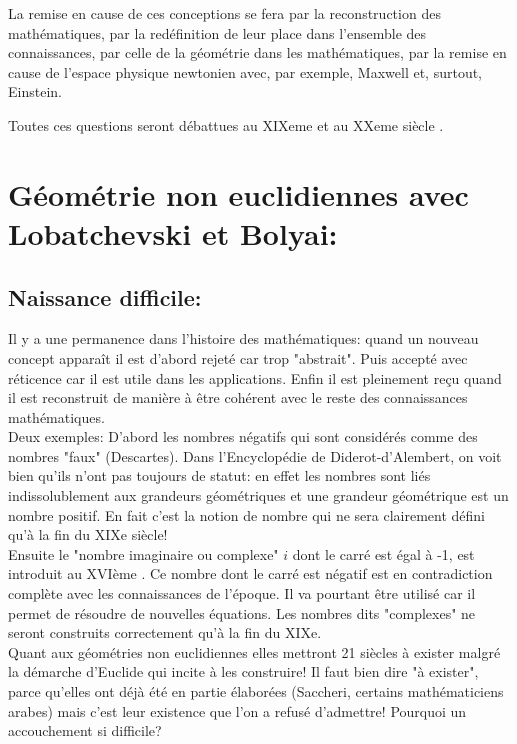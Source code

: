 \documentclass[a4paper, 12pt, twoside]{book}
\begin{document}
  La remise en cause de ces conceptions se fera par la reconstruction des mathématiques, par la redéfinition de leur place dans l'ensemble des connaissances, par celle de la géométrie dans les mathématiques, par la remise en cause de l'espace physique newtonien avec, par exemple, Maxwell et, surtout, Einstein.\
 
Toutes ces questions seront débattues au XIXeme et au XXeme siècle .\\

 

   \chapter{Géométrie non euclidiennes avec Lobatchevski et Bolyai:}
   \section{ Naissance difficile:}
     Il y a une permanence dans l’histoire des mathématiques: quand un nouveau concept apparaît il est d’abord rejeté car trop "abstrait". Puis accepté avec réticence car il est utile dans les applications. Enfin il est pleinement reçu quand il est reconstruit de manière à être cohérent avec le reste des connaissances mathématiques.\\
     
     

  Deux exemples:
  D’abord les nombres négatifs qui sont considérés comme des nombres "faux" (Descartes). Dans l’Encyclopédie de Diderot-d’Alembert, on voit bien qu’ils n’ont pas toujours de statut: en effet les nombres sont liés indissolublement aux grandeurs géométriques et une grandeur géométrique est un nombre positif. En fait c’est la notion de nombre qui ne sera clairement défini qu'à la fin du XIXe siècle!\\
  

   Ensuite le "nombre imaginaire ou complexe" $i$ dont le carré est égal à -1, est introduit au XVIème . Ce nombre dont le carré est négatif est en contradiction complète avec les connaissances de l’époque. Il va pourtant être utilisé car il permet de résoudre de nouvelles équations. Les nombres dits "complexes" ne seront construits correctement qu'à la fin du XIXe.\\
   

   Quant aux géométries non euclidiennes elles mettront 21 siècles à exister malgré la
démarche d’Euclide qui incite à les construire! Il faut bien dire "à exister", parce  qu'elles ont déjà été en partie élaborées (Saccheri, certains mathématiciens arabes) mais  c'est leur existence que l'on a refusé d'admettre!  Pourquoi un accouchement si difficile?\\
\end{document}
